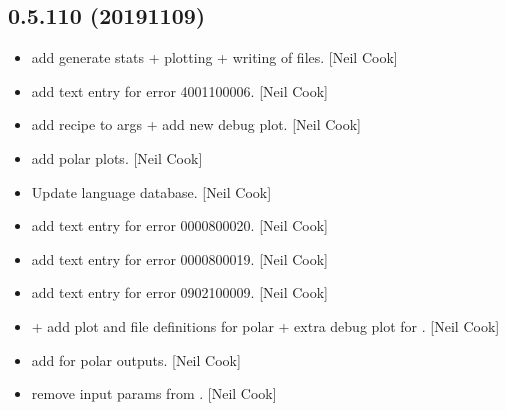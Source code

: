 \documentclass[a4paper,10pt,english]{report}
\begin{document}
\subsection{0.5.110 (2019\sphinxhyphen{}11\sphinxhyphen{}09)}
\label{\detokenize{misc/changelog:id51}}\begin{itemize}
\item {} 
 \sphinxhyphen{} add generate stats + plotting + writing of files.
{[}Neil Cook{]}

\item {} 
 \sphinxhyphen{} add text entry for error 40\sphinxhyphen{}011\sphinxhyphen{}00006. {[}Neil
Cook{]}

\item {} 
 \sphinxhyphen{} add recipe to args + add new debug
plot. {[}Neil Cook{]}

\item {} 
 \sphinxhyphen{} add polar plots. {[}Neil Cook{]}

\item {} 
Update language database. {[}Neil Cook{]}

\item {} 
 \sphinxhyphen{} add text entry for error 00\sphinxhyphen{}008\sphinxhyphen{}00020. {[}Neil Cook{]}

\item {} 
 \sphinxhyphen{} add text entry for error 00\sphinxhyphen{}008\sphinxhyphen{}00019. {[}Neil Cook{]}

\item {} 
 \sphinxhyphen{} add text entry for error 09\sphinxhyphen{}021\sphinxhyphen{}00009. {[}Neil Cook{]}

\item {} 
 +  \sphinxhyphen{}
add plot and file definitions for polar + extra debug plot for
. {[}Neil Cook{]}

\item {} 
 \sphinxhyphen{} add  for polar outputs.
{[}Neil Cook{]}

\item {} 
 \sphinxhyphen{} remove input params from
. {[}Neil Cook{]}


\end{itemize}
\end{document}
